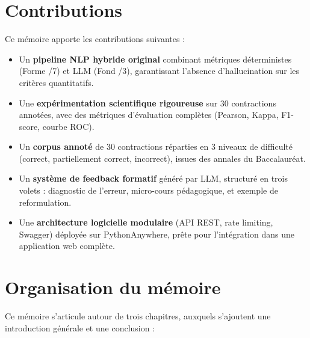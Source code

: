 \section*{Contributions}

Ce mémoire apporte les contributions suivantes :

\begin{itemize}
    \item Un \textbf{pipeline NLP hybride original} combinant métriques déterministes (Forme /7) et LLM (Fond /3), garantissant l'absence d'hallucination sur les critères quantitatifs.
    \item Une \textbf{expérimentation scientifique rigoureuse} sur 30 contractions annotées, avec des métriques d'évaluation complètes (Pearson, Kappa, F1-score, courbe ROC).
    \item Un \textbf{corpus annoté} de 30 contractions réparties en 3 niveaux de difficulté (correct, partiellement correct, incorrect), issues des annales du Baccalauréat.
    \item Un \textbf{système de feedback formatif} généré par LLM, structuré en trois volets : diagnostic de l'erreur, micro-cours pédagogique, et exemple de reformulation.
    \item Une \textbf{architecture logicielle modulaire} (API REST, rate limiting, Swagger) déployée sur PythonAnywhere, prête pour l'intégration dans une application web complète.
\end{itemize}

\section*{Organisation du mémoire}

Ce mémoire s'articule autour de trois chapitres, auxquels s'ajoutent une introduction générale et une conclusion :

